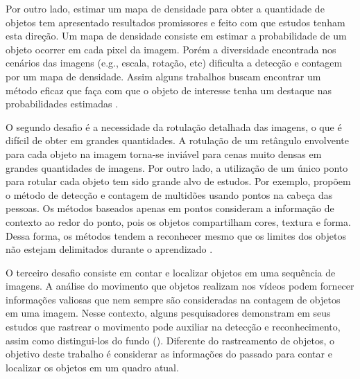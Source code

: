     Por outro lado, estimar um mapa de densidade para obter a quantidade de objetos tem apresentado resultados promissores \cite{DBLP:journals/corr/abs-1808-01050,880968,Cao2017} e  feito com que estudos tenham esta direção.
    Um mapa de densidade consiste em estimar a probabilidade de um objeto ocorrer em cada pixel da imagem.
    Porém a diversidade encontrada nos cenários das imagens (e.g., escala, rotação, etc) dificulta a detecção e contagem por um mapa de densidade. Assim alguns trabalhos buscam encontrar um método eficaz que faça com que o objeto de interesse tenha um destaque nas probabilidades estimadas \cite{inproceedings} \cite{DBLP:journals/corr/abs-1711-04433}.

    O segundo desafio é a necessidade da rotulação detalhada das imagens, o que é difícil de obter em grandes quantidades.
    A rotulação de um retângulo envolvente para cada objeto na imagem torna-se inviável para cenas muito densas em grandes quantidades de imagens.
     Por outro lado, a utilização de um único ponto para rotular cada objeto \cite{8237708} tem sido grande alvo de estudos.
     Por exemplo, \cite{DBLP:peri/corr/abs-1904-01333} propõem o método de detecção e contagem de multidões usando pontos na cabeça das pessoas.
     Os métodos baseados apenas em pontos consideram a informação de contexto ao redor do ponto, pois os objetos compartilham cores, textura e forma.
     Dessa forma, os métodos tendem a reconhecer mesmo que os limites dos objetos não estejam delimitados durante o aprendizado \cite{Aich2018ImprovingOC}.

    O terceiro desafio consiste em contar e localizar objetos em uma sequência de imagens.
   A análise do movimento que objetos realizam nos vídeos podem fornecer informações valiosas que nem sempre são consideradas na contagem de objetos em uma imagem.
Nesse contexto, alguns pesquisadores demonstram em seus estudos que rastrear o movimento pode auxiliar na detecção e reconhecimento, assim como distingui-los do fundo (\cite{Ma_2015_ICCV,Nam_2016_CVPR,Danelljan_2015_ICCV_Workshops,WANG201962,8898173,ExtractHuman}).
   Diferente do rastreamento de objetos, o objetivo deste trabalho é considerar as informações do passado para contar e localizar os objetos em um quadro atual.

